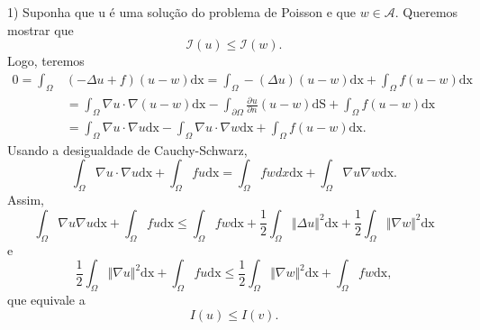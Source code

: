 \documentclass[../pde_notes.tex]{subfiles}
\begin{document}
\begin{proof*}
	1) Suponha que u é uma solução do problema de Poisson e que \(w\in \mathcal{A}\). Queremos mostrar que
	\[
		\mathcal{I}(u)\leq \mathcal{I}(w).
	\]
	Logo, teremos
	\begin{align*}
		0 = \int_{\Omega }^{} & (-\Delta u +f)(u-w)  \mathrm{dx}  = \int_{\Omega }^{}-(\Delta u)(u-w) \mathrm{dx} + \int_{\Omega }^{}f(u-w) \mathrm{dx}                                                          \\
		                      & = \int_{\Omega }^{}\nabla u \cdot \nabla (u-w) \mathrm{dx} - \int_{\partial \Omega }^{}\frac{\partial^{}u}{\partial n^{}}(u-w) \mathrm{dS} + \int_{\Omega }^{}f(u-w) \mathrm{dx} \\
		                      & = \int_{\Omega }^{}\nabla u \cdot \nabla u \mathrm{dx} - \int_{\Omega }^{}\nabla u \cdot \nabla w \mathrm{dx} + \int_{\Omega }^{}f(u-w) \mathrm{dx}.
	\end{align*}
	Usando a desigualdade de Cauchy-Schwarz,
	\[
		\int_{\Omega }^{}\nabla u \cdot \nabla u \mathrm{dx} + \int_{\Omega }^{}f u \mathrm{dx}= \int_{\Omega }^{}fw dx \mathrm{dx} + \int_{\Omega }^{}\nabla u \nabla w \mathrm{dx}.
	\]
	Assim,
	\[
		\int_{\Omega }^{}\nabla u\nabla u \mathrm{dx} + \int_{\Omega }^{}fu \mathrm{dx} \leq \int_{\Omega }^{}fw \mathrm{dx} + \frac{1}{2}\int_{\Omega }^{}\Vert \Delta u \Vert^{2} \mathrm{dx} + \frac{1}{2}\int_{\Omega }^{}\Vert \nabla w \Vert^{2} \mathrm{dx}
	\]
	e
	\[
		\frac{1}{2}\int_{\Omega }^{}\Vert \nabla u \Vert^{2} \mathrm{dx} + \int_{\Omega }^{}f u  \mathrm{dx} \leq \frac{1}{2}\int_{\Omega }^{}\Vert \nabla w \Vert^{2} \mathrm{dx} + \int_{\Omega }^{}fw \mathrm{dx},
	\]
	que equivale a
	\[
		I(u)\leq I(v).
	\]


\end{proof*}
\end{document}
